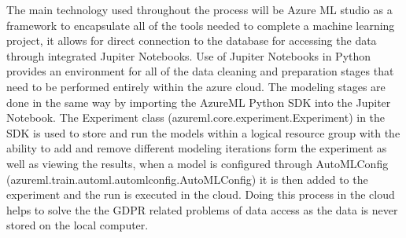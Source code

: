 The main technology used throughout the process will be Azure ML studio as a framework to encapsulate all of the tools needed to complete a machine learning project, it allows for direct connection to the database for accessing the data through integrated Jupiter Notebooks. Use of Jupiter Notebooks in Python provides an environment for all of the data cleaning and preparation stages that need to be performed entirely within the azure cloud. The modeling stages are done in the same way by importing the AzureML Python SDK into the Jupiter Notebook. The Experiment class (azureml.core.experiment.Experiment) in the SDK is used to store and run the models within a logical resource group with the ability to add and remove different modeling iterations form the experiment as well as viewing the results, when a model is configured through AutoMLConfig (azureml.train.automl.automlconfig.AutoMLConfig) it is then added to the experiment and the run is executed in the cloud. Doing this process in the cloud helps to solve the the GDPR related problems of data access as the data is never stored on the local computer.
\begin{itemize}
\end{itemize}
